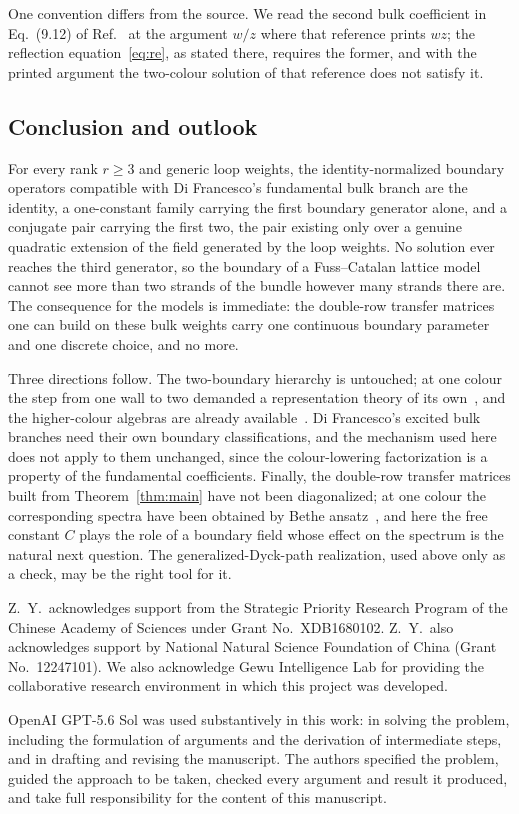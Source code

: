 \documentclass[
  aps,pre,
  reprint,
  superscriptaddress,
  amsmath,amssymb,
  floatfix
]{revtex4-2}
\theoremstyle{plain}
\theoremstyle{definition}
\theoremstyle{remark}
\begin{document}
One convention differs from the source. We read the second bulk coefficient in
Eq.~(9.12) of Ref.~\cite{shigechi2025fuss} at the argument $w/z$ where that
reference prints $wz$; the reflection equation~\eqref{eq:re}, as stated there,
requires the former, and with the printed argument the two-colour solution of
that reference does not satisfy it.

\subsection{Conclusion and outlook}

For every rank $r\ge3$ and generic loop weights, the identity-normalized
boundary operators compatible with Di Francesco's fundamental bulk branch are
the identity, a one-constant family carrying the first boundary generator
alone, and a conjugate pair carrying the first two, the pair existing only over
a genuine quadratic extension of the field generated by the loop weights. No
solution ever reaches the third generator, so the boundary of a
Fuss--Catalan lattice model cannot see more than two strands of the bundle
however many strands there are. The consequence for the models is immediate:
the double-row transfer matrices one can build on these bulk weights carry one
continuous boundary parameter and one discrete choice, and no more.

Three directions follow. The two-boundary hierarchy is untouched; at one colour
the step from one wall to two demanded a representation theory of its
own~\cite{de2009two}, and the higher-colour algebras are already
available~\cite{shigechi2025fuss}. Di Francesco's excited bulk branches need
their own boundary classifications, and the mechanism used here does not apply
to them unchanged, since the colour-lowering factorization is a property of the
fundamental coefficients. Finally, the double-row transfer matrices built from
Theorem~\ref{thm:main} have not been diagonalized; at one colour the corresponding spectra
have been obtained by Bethe ansatz~\cite{Gier_2004ba,Ribeiro_2013ba,Nepomechie_2016ub}, and here
the free constant $C$ plays the role of a boundary field whose effect on the
spectrum is the natural next question. The generalized-Dyck-path realization,
used above only as a check, may be the right tool for it.

\begin{acknowledgments}
Z.\ Y.\ acknowledges support from the Strategic Priority Research Program of the
Chinese Academy of Sciences under Grant No.~XDB1680102. Z.\ Y.\ also
acknowledges support by National Natural Science Foundation of China (Grant
No.~12247101). We also acknowledge Gewu Intelligence Lab for providing the
collaborative research environment in which this project was developed.

OpenAI GPT-5.6 Sol was used substantively in this work: in solving the
problem, including the formulation of arguments and the derivation of
intermediate steps, and in drafting and revising the manuscript. The authors
specified the problem, guided the approach to be taken, checked every argument
and result it produced, and take full responsibility for the content of this
manuscript.
\end{acknowledgments}
\end{document}
